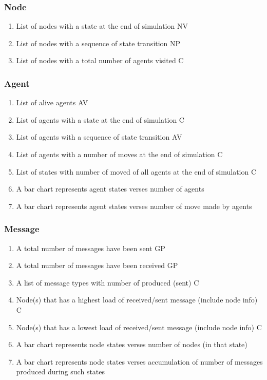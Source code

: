 \subsubsection*{Node}
\begin{enumerate}
\item List of nodes with a state at the end of simulation NV
\item List of nodes with a sequence of state transition NP
\item List of nodes with a total number of agents visited  C
\end{enumerate}

\subsubsection*{Agent}
\begin{enumerate}
\item List of alive agents AV
\item List of agents with a state at the end of simulation C
\item List of agents with a sequence of state transition AV
\item List of agents with a number of moves at the end of simulation C
\item List of states with number of moved of all agents at the end of simulation C

\item A bar chart represents agent states verses number of agents
\item A bar chart represents agent states verses number of move made by agents
\end{enumerate}

\subsubsection*{Message}
\begin{enumerate}
\item A total number of messages have been sent GP
\item A total number of messages have been received GP
\item A list of message types with number of produced (sent) C
\item Node(s) that has a highest load of received/sent message (include node info) C
\item Node(s) that has a lowest load of received/sent message (include node info) C

\item A bar chart represents node states verses number of nodes (in that state)
\item A bar chart represents node states verses accumulation of number of messages produced during such states
\end{enumerate}


